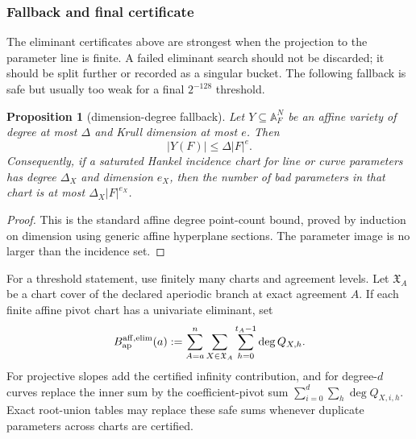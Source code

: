 \documentclass[11pt]{article}
\newtheorem{proposition}[theorem]{Proposition}
\theoremstyle{definition}
\theoremstyle{remark}
\begin{document}
\subsubsection{Fallback and final certificate}

The eliminant certificates above are strongest when the projection to the
parameter line is finite.  A failed eliminant search should not be discarded; it
should be split further or recorded as a singular bucket.  The following fallback
is safe but usually too weak for a final $2^{-128}$ threshold.

\begin{proposition}[dimension-degree fallback]
\label{prop:dimension-degree-fallback}
Let $Y\subseteq\mathbb A^N_F$ be an affine variety of degree at most $\Delta$ and
Krull dimension at most $e$.  Then
\[
        |Y(F)|\le \Delta |F|^e .
\]
Consequently, if a saturated Hankel incidence chart for line or curve parameters
has degree $\Delta_X$ and dimension $e_X$, then the number of bad parameters in
that chart is at most $\Delta_X|F|^{e_X}$.
\end{proposition}

\begin{proof}
This is the standard affine degree point-count bound, proved by induction on
dimension using generic affine hyperplane sections.  The parameter image is no
larger than the incidence set.
\end{proof}

For a threshold statement, use finitely many charts and agreement levels.  Let
$\mathfrak X_A$ be a chart cover of the declared aperiodic branch at exact
agreement $A$.  If each finite affine pivot chart has a univariate eliminant, set
\[
        B_{\rm ap}^{\rm aff,elim}(a)
        :=\sum_{A=a}^n\sum_{X\in\mathfrak X_A}
          \sum_{h=0}^{t_A-1}\deg Q_{X,h} .
\]
For projective slopes add the certified infinity contribution, and for degree-$d$
curves replace the inner sum by the coefficient-pivot sum
$\sum_{i=0}^d\sum_h\deg Q_{X,i,h}$.  Exact root-union tables may replace these
safe sums whenever duplicate parameters across charts are certified.
\end{document}

